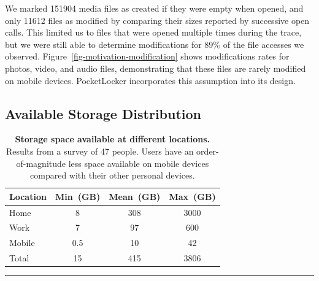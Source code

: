 We marked \num{151904} media files as created if they were empty when opened,
and only \num{11612} files as modified by comparing their sizes reported by
successive open calls. This limited us to files that were opened multiple
times during the trace, but we were still able to determine modifications for
89\% of the file accesses we observed.
Figure~\ref{fig-motivation-modification} shows modifications rates for
photos, video, and audio files, demonstrating that these files are rarely
modified on mobile devices. PocketLocker incorporates this assumption into
its design.

\subsection{Available Storage Distribution}

\begin{table}[t]
{\small
\begin{tabularx}{\textwidth}{Xccc}

\textbf{Location} & \textbf{Min~(GB)} & \textbf{Mean~(GB)} &
\textbf{Max~(GB)} \\ \toprule
Home & 8 & 308 & 3000 \\
Work & 7 & 97 & 600 \\
Mobile & 0.5 & 10 & 42 \\
Total & 15 & 415 & 3806 \\

\end{tabularx}
}

\caption{\small \textbf{Storage space available at different locations.}
Results from a survey of 47 people. Users have an order-of-magnitude less
space available on mobile devices compared with their other personal
devices.}

\label{table-storagesurvey}
  
\vspace*{0.05in}

\hrule

\vspace*{-0.2in}

\end{table}

